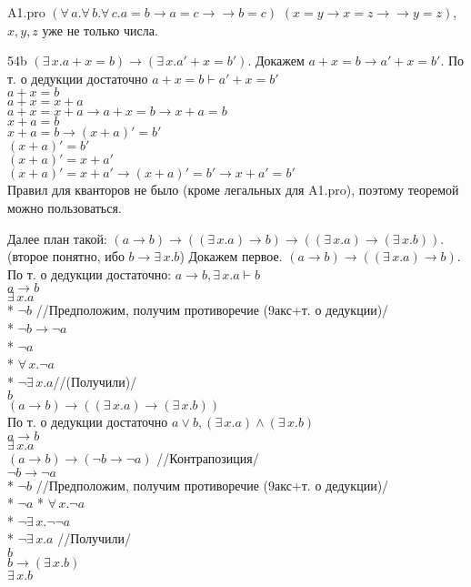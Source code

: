 \documentclass[12pt]{article}
\begin{document}
\newpage

A1.pro $(\forall\,a.\forall\,b.\forall\,c.a=b\to a=c\to\to b=c)$
$(x=y\to x=z\to\to y=z)$, $x,y,z$ уже не только числа.

54b $(\exists\,x.a+x=b)\to(\exists\,x.a'+x=b')$.
Докажем $a+x=b\to a'+x=b'$. По т. о дедукции достаточно $a+x=b\vdash a'+x=b'$\\
$a+x=b$\\
$a+x=x+a$\\
$a+x=x+a\to a+x=b\to x+a=b$\\
$x+a=b$\\
$x+a=b\to(x+a)'=b'$\\
$(x+a)'=b'$\\
$(x+a)'=x+a'$\\
$(x+a)'=x+a'\to(x+a)'=b'\to x+a'=b'$\\
Правил для кванторов не было (кроме легальных для A1.pro), поэтому теоремой можно пользоваться.

Далее план такой:
$(a\to b)\to((\exists\,x.a)\to b)\to((\exists\,x.a)\to(\exists\,x.b))$. (второе понятно, ибо $b\to\exists\,x.b$)
Докажем первое. $(a\to b)\to((\exists\,x.a)\to b)$.
По т. о дедукции достаточно: $a\to b, \exists\,x.a\vdash b$\\
$a\to b$\\
$\exists\,x.a$\\
* $\neg b$ //Предположим, получим противоречие (9акс+т. о дедукции)/\\
* $\neg b\to\neg a$\\
* $\neg a$\\
* $\forall\,x.\neg a$\\
* $\neg\exists\,x.a$//(Получили)/\\
$b$\\

$(a\to b)\to((\exists\,x.a)\to(\exists\,x.b))$\\
По т. о дедукции достаточно $a\vee b,(\exists\,x.a)\wedge(\exists\,x.b)$\\
$a\to b$\\
$\exists\,x.a$\\
$(a\to b)\to(\neg b\to \neg a)$ //Контрапозиция/\\
$\neg b\to \neg a$\\
* $\neg b$ //Предположим, получим противоречие (9акс+т. о дедукции)/\\
* $\neg a$
* $\forall\,x.\neg a$\\
* $\neg\exists\,x.\neg\neg a$\\
* $\neg\exists\,x.a$ //Получили/\\
$b$\\
$b\to(\exists\,x.b)$\\
$\exists\,x.b$\\
\end{document}
